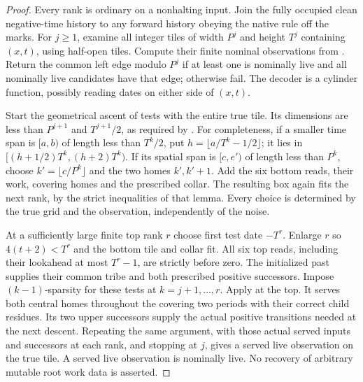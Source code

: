 \begin{proof}
Every rank is ordinary on a nonhalting input. Join the fully occupied
clean negative-time history to any forward history obeying the native
rule off the marks. For $j\ge1$, examine all integer tiles of width
$P^j$ and height $T^j$ containing $(x,t)$, using half-open tiles.
Compute their finite nominal observations from
\cite[Definition~5.1]{DMline}. Return the common left edge modulo
$P^j$ if at least one is nominally live and all nominally live
candidates have that edge; otherwise fail. The decoder is a cylinder
function, possibly reading dates on either side of $(x,t)$.

Start the geometrical ascent of tests with the entire true tile.
Its dimensions are less than $P^{j+1}$ and $T^{j+1}/2$, as required
by \cite[Lemma~6.5]{DMline}. For completeness, if a smaller time span
is $[a,b)$ of length less than $T^k/2$, put
$h=\lfloor a/T^k-1/2\rfloor$; it lies in
$[(h+1/2)T^k,(h+2)T^k)$. If its spatial span is $[c,e')$ of length
less than $P^k$, choose $k'=\lfloor c/P^k\rfloor$ and the two homes
$k',k'+1$. Add the six bottom reads, their work, covering homes and
the prescribed collar. The resulting box again fits the next rank,
by the strict inequalities of that lemma. Every choice is determined
by the true grid and the observation, independently of the noise.

At a sufficiently large finite top rank $r$ choose first test date
$-T^r$. Enlarge $r$ so $4(t+2)<T^r$ and the bottom tile and collar fit.
All six top reads, including their lookahead at most $T^r-1$, are
strictly before zero. The initialized past supplies their common
tribe and both prescribed positive successors. Impose
$(k-1)$-sparsity for these tests at $k=j+1,\ldots,r$.
Apply \cite[Lemma~5.24]{DMline} at the top. It serves both central
homes throughout the covering two periods with their correct child
residues. Its two upper successors supply the actual positive
transitions needed at the next descent. Repeating the same argument,
with those actual served inputs and successors at each rank, and
stopping at $j$, gives a served live observation on the true tile.
A served live observation is nominally live. No recovery of arbitrary
mutable root work data is asserted.


\end{proof}
